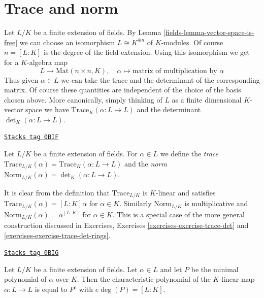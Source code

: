 \section{Trace and norm}
\label{fields-section-trace-pairing}
Let $L/K$ be a finite extension of fields. By
Lemma \ref{fields-lemma-vector-space-is-free}
we can choose an isomorphism $L \cong K^{\oplus n}$ of $K$-modules.
Of course $n = [L : K]$ is the degree of the field extension.
Using this isomorphism we get for a $K$-algebra map
$$
L \longrightarrow \text{Mat}(n \times n, K),\quad
\alpha \longmapsto \text{matrix of multiplication by }\alpha
$$
Thus given $\alpha \in L$ we can take the trace and the determinant
of the corresponding matrix. Of course these quantities are independent
of the choice of the basis chosen above. More canonically, simply thinking
of $L$ as a finite dimensional $K$-vector space we have
$\text{Trace}_K(\alpha : L \to L)$ and the determinant
$\det_K(\alpha : L \to L)$.

\begin{definition}
\label{fields-definition-trace-norm}
\href{https://stacks.math.columbia.edu/tag/0BIF}{\texttt{Stacks tag 0BIF}}

Let $L/K$ be a finite extension of fields. For $\alpha \in L$ we define
the {\it trace}
$\text{Trace}_{L/K}(\alpha) = \text{Trace}_K(\alpha : L \to L)$
and the {\it norm}
$\text{Norm}_{L/K}(\alpha) = \det_K(\alpha : L \to L)$.
\end{definition}

It is clear from the definition that
$\text{Trace}_{L/K}$ is $K$-linear and satisfies
$\text{Trace}_{L/K}(\alpha) = [L : K]\alpha$ for $\alpha \in K$.
Similarly $\text{Norm}_{L/K}$ is multiplicative and
$\text{Norm}_{L/K}(\alpha) = \alpha^{[L : K]}$ for $\alpha \in K$.
This is a special case of the more general construction discussed
in Exercises, Exercises \ref{exercises-exercise-trace-det} and
\ref{exercises-exercise-trace-det-rings}.

\begin{lemma}
\label{fields-lemma-characteristic-vs-minimal-polynomial}
\href{https://stacks.math.columbia.edu/tag/0BIG}{\texttt{Stacks tag 0BIG}}

Let $L/K$ be a finite extension of fields. Let $\alpha \in L$ and let $P$
be the minimal polynomial of $\alpha$ over $K$. Then the characteristic
polynomial of the $K$-linear map $\alpha : L \to L$ is equal to
$P^e$ with $e \deg(P) = [L : K]$.
\end{lemma}

